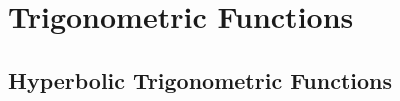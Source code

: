 \begin{description}
\begin{description}
\begin{description}
\begin{description}
\begin{description}
\begin{description}
\begin{description}
\begin{description}
\begin{description}
\begin{description}
\begin{description}
\begin{description}
\begin{description}
\begin{description}
\begin{description}
\begin{description}
\begin{description}
\begin{description}
\section{Trigonometric Functions}

\begin{description}   %



\section{Hyperbolic Trigonometric Functions}


\end{description}
\end{description}
\end{description}
\end{description}
\end{description}
\end{description}
\end{description}
\end{description}
\end{description}
\end{description}
\end{description}
\end{description}
\end{description}
\end{description}
\end{description}
\end{description}
\end{description}
\end{description}
\end{description}
